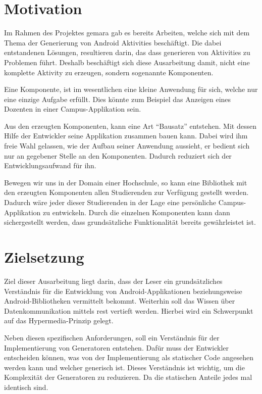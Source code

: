 \section{Motivation}\label{sec:motivation}
Im Rahmen des Projektes \ac{gemara} gab es bereits Arbeiten, welche sich mit dem Thema der Generierung von Android Aktivities beschäftigt. Die dabei entstandenen Lösungen, resultieren darin, das dass generieren von Aktivities zu Problemen führt. Deshalb beschäftigt sich diese Ausarbeitung damit, nicht eine komplette Aktivity zu erzeugen, sondern sogenannte Komponenten.

Eine Komponente, ist im wesentlichen eine kleine Anwendung für sich, welche nur eine einzige Aufgabe erfüllt. Dies könnte zum Beispiel das Anzeigen eines Dozenten in einer Campus-Applikation sein.

Aus den erzeugten Komponenten, kann eine Art \enquote{Bausatz} entstehen. Mit dessen Hilfe der Entwickler seine Applikation zusammen bauen kann. Dabei wird ihm freie Wahl gelassen, wie der Aufbau seiner Anwendung aussieht, er bedient sich nur an gegebener Stelle an den Komponenten. Dadurch reduziert sich der Entwicklungsaufwand für ihn.

Bewegen wir uns in der Domain einer Hochschule, so kann eine Bibliothek mit den erzeugten Komponenten allen Studierenden zur Verfügung gestellt werden. Dadurch wäre jeder dieser Studierenden in der Lage eine persönliche Campus-Applikation zu entwickeln. Durch die einzelnen Komponenten kann dann sichergestellt werden, dass grundsätzliche Funktionalität bereits gewährleistet ist.

\section{Zielsetzung}\label{sec:target}
Ziel dieser Ausarbeitung liegt darin, dass der Leser ein grundsätzliches Verständnis für die Entwicklung von Android-Applikationen beziehungsweise Android-Bibliotheken vermittelt bekommt. Weiterhin soll das Wissen über Datenkommunikation mittels \ac{rest} vertieft werden. Hierbei wird ein Schwerpunkt auf das Hypermedia-Prinzip gelegt. 

Neben diesen spezifischen Anforderungen, soll ein Verständnis für der Implementierung von Generatoren entstehen. Dafür muss der Entwickler entscheiden können, was von der Implementierung als statischer Code angesehen werden kann und welcher generisch ist. Dieses Verständnis ist wichtig, um die Komplexität der Generatoren zu reduzieren. Da die statischen Anteile jedes mal identisch sind.

